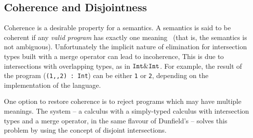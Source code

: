 



\subsection{Coherence and Disjointness}
\label{subsec:coherence}
Coherence is a desirable property for a semantics. 
A semantics is said to be coherent if any \emph{valid program} has exactly one
meaning~\cite{reynolds1991coherence} (that is, the semantics is not ambiguous).
Unfortunately the implicit nature of elimination for intersection
types built with a merge operator can lead to incoherence,
This is due to intersections with overlapping types, as in
$\texttt{Int} \& \texttt{Int}$.
For example, the result of the program (\lstinline$(1,,2) : Int$)
can be either \lstinline$1$ or \lstinline$2$, depending on the implementation 
of the language.

One option to restore coherence is to reject programs which may have
multiple meanings.
The \oldname {} system -- a calculus with
a simply-typed calculus with intersection types and 
a merge operator, in the same flavour of Dunfield's -- solves this problem
by using the concept of disjoint intersections. 

\begin{comment}
If both results are accepted, we say that the semantics is
\emph{incoherent}: there are multiple possible meanings for the same
valid program. 
Dunfield's calculus~\cite{dunfield2014elaborating} is incoherent and accepts the
program above.\bruno{Well this text needs a significant revision
  because now our ICFP paper largely solves this problem. So you want,
at some point, to summarise the key result of the ICFP paper: we know
how todo coherent intersection types for a simply typed calculus. 
Then you want to setup the problem for this paper: but how about
polymorphism? what are the challenges, why is it hard?}
\end{comment}


